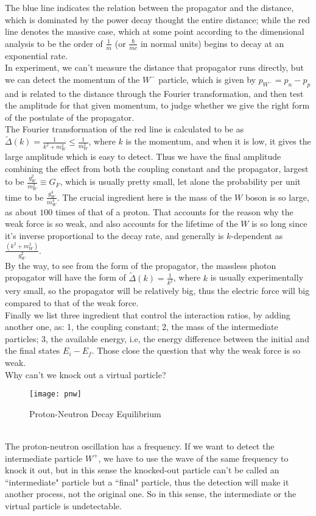 \documentclass{article}
\renewcommand{\1}{\left}
\renewcommand{\2}{\right}
\newcommand{\Del}{\Delta}
\begin{document}
The blue line indicates the relation between the propagator and the distance, which is dominated by the power decay thought  the entire distance; while the red line denotes the  massive  case, which at some point according to the dimensional analysis to be the order of $\frac 1 m$ (or $\frac{\hbar}{mc}$ in normal units) begins to decay at an exponential rate.\\
In experiment, we can't measure the distance that propagator runs directly, but we can detect the momentum of the $W^-$ particle, which is given by $p_{W^-}=p_n-p_p$ and is related to the distance through the Fourier transformation, and then test the amplitude for that given momentum, to judge whether we give the right form of the postulate of the propagator.\\
The Fourier transformation of the red line is calculated to be as $\tilde\Delta(k)=\frac 1 {k^2+m_W^2}\leq\frac 1 {m_W^2}$, where $k$ is the momentum, and when it is low, it gives the large amplitude which is easy to detect. Thus we have the final amplitude combining the effect from both the coupling constant and the propagator, largest to be $\frac{g_W^2}{m_W^2}\equiv G_F$, which is usually pretty small, let alone the probability per unit time to be $\frac{g_W^4}{m_W^4}$. The crucial ingredient here is the mass of the $W$ boson is so large, as about $100$ times of that of a proton. That accounts for the reason why the weak force is so weak, and also accounts for the lifetime of the $W$ is so long since it's inverse proportional to the decay rate, and generally is $k$-dependent as $\frac{(k^2+m_W^2)}{g_W^2}$.\\
By the way, to see from the form of the propagator, the massless photon propagator will have the form of $\tilde\Del(k)=\frac1{k^2}$, where $k$ is usually experimentally very small, so the propagator will be relatively big, thus the electric force will big compared to that of the weak force.\\
Finally we list three ingredient that control the interaction ratios, by adding another one, as: 1, the coupling constant; 2, the mass of the intermediate particles; 3, the available energy, i.e, the energy difference between the initial and the final states $E_i-E_f$. Those close the question that why the weak force is so weak.\\

Why can't we knock out a virtual particle?
\begin{figure}[h]
\centering
\texttt{[image: pnw]}
\caption{Proton-Neutron Decay Equilibrium}
\end{figure}\\
The proton-neutron oscillation has a frequency. If we want to detect the intermediate particle $W^+$, we have to use the wave of the same frequency to knock it out, but in this sense the knocked-out particle can't be called an ``intermediate" particle but a ``final" particle, thus the detection will make it another process, not the original one. So in this sense, the intermediate or the virtual particle is undetectable.\\
\end{document}
